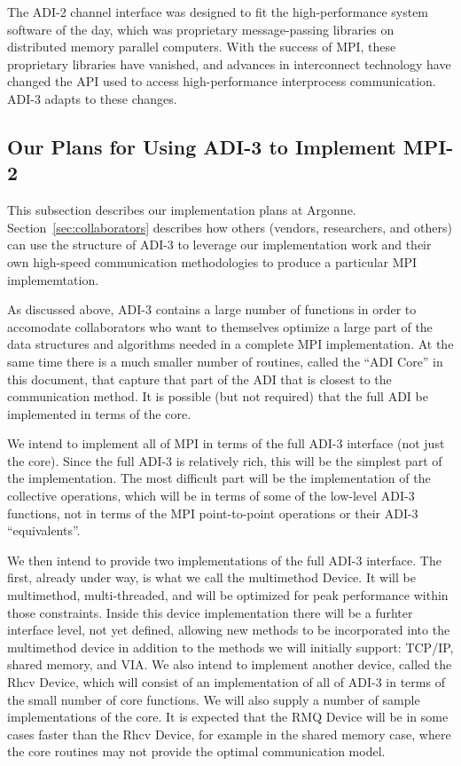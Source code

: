 \documentclass{article}
\begin{document}
The ADI-2 channel interface was designed to fit the high-performance system
software of the day, which was proprietary message-passing libraries on
distributed memory parallel computers.  With the success of MPI, these
proprietary libraries have vanished, and advances in interconnect technology
have changed the API used to access high-performance interprocess
communication.  ADI-3 adapts to these changes.

\subsection{Our Plans for Using ADI-3 to Implement MPI-2}
\label{sec:plans}

%
%
This subsection describes our implementation plans at Argonne.  
Section~\ref{sec:collaborators} describes how others (vendors,
researchers, and others) can 
use the structure of ADI-3 to leverage our implementation work and their own
high-speed communication methodologies to produce a particular MPI
implememtation.

As discussed above, ADI-3 contains a large number of functions in order to
accomodate collaborators who want to themselves optimize a large part of the
data structures and algorithms needed in a complete MPI implementation.  At the
same time there is a much smaller number of routines, called the ``ADI Core''
in this document, that capture that part of the ADI that is closest to the
communication method. It is possible (but not required) that the full ADI be
implemented in terms of the core.

We intend to implement all of MPI in terms of the full ADI-3 interface (not
just the core).  Since the full ADI-3 is relatively rich, this will be the
simplest part of the implementation.  The most difficult part will be the
implementation of the collective operations, which will be in terms of some of
the low-level ADI-3 functions, not in terms of the MPI point-to-point
operations or their ADI-3 ``equivalents''.

We then intend to provide two implementations of the full ADI-3 interface.
The first, already under way, is what we call the multimethod Device.
It will be  
multimethod, multi-threaded, and will be optimized for peak performance within
those constraints.  Inside this device implementation there will be a furhter
interface level, not yet defined, allowing new methods to be incorporated into
the multimethod device in addition to the methods we will initially
support:  TCP/IP, 
shared memory, and VIA.  We also intend to implement another device, called 
the Rhcv Device, which will consist of an implementation of all of ADI-3 in
terms of the small number of core functions.  We will also supply a number of
sample implementations of the core.  It is expected that the RMQ Device will
be in some cases faster than the Rhcv Device, for example in the shared
memory case, where the core routines may not provide the optimal communication
model. 
\end{document}
